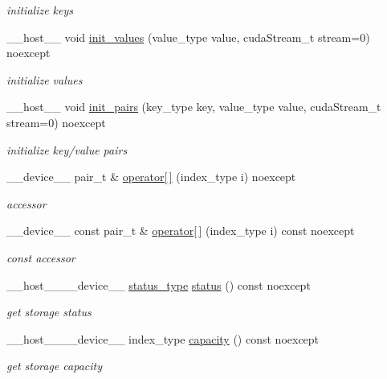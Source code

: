 \begin{DoxyCompactItemize}
\begin{DoxyCompactList}\small\item\em initialize keys \end{DoxyCompactList}\item 
\+\_\+\+\_\+host\+\_\+\+\_\+ void \hyperlink{classwarpcore_1_1storage_1_1key__value_1_1AoSStore_a7bd77a5fa999cbb2c9e7b1c05242ffdb}{init\+\_\+values} (value\+\_\+type value, cuda\+Stream\+\_\+t stream=0) noexcept
\begin{DoxyCompactList}\small\item\em initialize values \end{DoxyCompactList}\item 
\+\_\+\+\_\+host\+\_\+\+\_\+ void \hyperlink{classwarpcore_1_1storage_1_1key__value_1_1AoSStore_a8d25d5ca659f80f99f7d58c4315484c9}{init\+\_\+pairs} (key\+\_\+type key, value\+\_\+type value, cuda\+Stream\+\_\+t stream=0) noexcept
\begin{DoxyCompactList}\small\item\em initialize key/value pairs \end{DoxyCompactList}\item 
\+\_\+\+\_\+device\+\_\+\+\_\+ pair\+\_\+t \& \hyperlink{classwarpcore_1_1storage_1_1key__value_1_1AoSStore_a1dc6e71373b4c7a8faae26f82309ca18}{operator\mbox{[}$\,$\mbox{]}} (index\+\_\+type i) noexcept
\begin{DoxyCompactList}\small\item\em accessor \end{DoxyCompactList}\item 
\+\_\+\+\_\+device\+\_\+\+\_\+ const pair\+\_\+t \& \hyperlink{classwarpcore_1_1storage_1_1key__value_1_1AoSStore_aabe6b321af8906b9342a1937b462f5dd}{operator\mbox{[}$\,$\mbox{]}} (index\+\_\+type i) const noexcept
\begin{DoxyCompactList}\small\item\em const accessor \end{DoxyCompactList}\item 
\+\_\+\+\_\+host\+\_\+\+\_\+\+\_\+\+\_\+device\+\_\+\+\_\+ \hyperlink{classwarpcore_1_1Status}{status\+\_\+type} \hyperlink{classwarpcore_1_1storage_1_1key__value_1_1AoSStore_a040cd6b5abf7ad6b2f20d44d5bae38bf}{status} () const noexcept
\begin{DoxyCompactList}\small\item\em get storage status \end{DoxyCompactList}\item 
\+\_\+\+\_\+host\+\_\+\+\_\+\+\_\+\+\_\+device\+\_\+\+\_\+ index\+\_\+type \hyperlink{classwarpcore_1_1storage_1_1key__value_1_1AoSStore_a23c4cb728f870dfa09a0d0d976cedf8e}{capacity} () const noexcept
\begin{DoxyCompactList}\small\item\em get storage capacity \end{DoxyCompactList}\end{DoxyCompactItemize}


